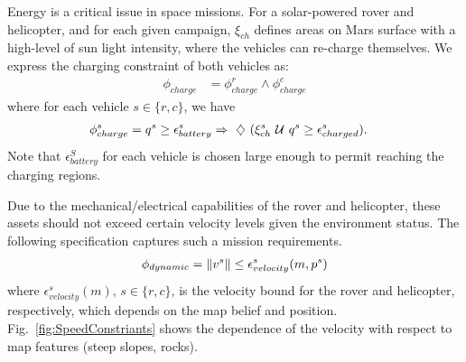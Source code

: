 \documentclass[letterpaper]{article} %
\begin{document}
\noindent{} Energy is a critical issue in space missions. For a solar-powered rover and helicopter, and for each given campaign, $\xi_{ch}$ defines areas on Mars surface with a high-level of sun light intensity, where the vehicles can re-charge themselves. We express the charging constraint of both vehicles as:
 	\begin{align}
	    \phi_{charge} &= \phi_{charge}^r \land \phi_{charge}^c
	\end{align}
	where for each vehicle $s \in \{r, c\}$, we have
	\begin{align}
	    \phi_{charge}^s &= q^s \geq \epsilon_{battery}^s \Rightarrow \ \diamondsuit\  (\xi^s_{ch} \ \mathcal{U}\  q^s \geq \epsilon_{charged}^s).
	\end{align}
	Note that $\epsilon_{battery}^S$ for each vehicle is chosen large enough to permit reaching the charging regions.

\noindent{} Due to the mechanical/electrical capabilities of the rover and helicopter, these assets should not exceed certain velocity levels given the environment status. The following specification captures such a mission requirements.
    \begin{align}
	    \phi_{dynamic} = \left\| {v^s} \right\| \leq \epsilon_{velocity}^s(m, p^s)
	\end{align}
	where $\epsilon_{velocity}^s(m)$, $s\in \{r, c\}$, is the velocity
	bound for the rover and helicopter, respectively, which depends on the map belief and position.
	Fig.~\ref{fig:SpeedConstriants} shows the dependence of the velocity with respect to
	map features (steep slopes, rocks).
	


	
	
	
	
\end{document}
